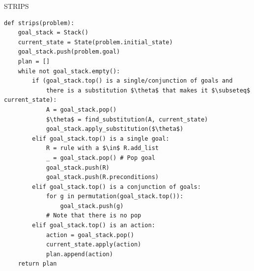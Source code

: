 \begin{algorithm}[H]
\caption{STRIPS}
\begin{lstlisting}[mathescape=true]
def strips(problem):
    goal_stack = Stack()
    current_state = State(problem.initial_state)
    goal_stack.push(problem.goal)
    plan = []
    while not goal_stack.empty():
        if (goal_stack.top() is a single/conjunction of goals and
            there is a substitution $\theta$ that makes it $\subseteq$ current_state):
            A = goal_stack.pop()
            $\theta$ = find_substitution(A, current_state)
            goal_stack.apply_substitution($\theta$)
        elif goal_stack.top() is a single goal:
            R = rule with a $\in$ R.add_list
            _ = goal_stack.pop() # Pop goal
            goal_stack.push(R)
            goal_stack.push(R.preconditions)
        elif goal_stack.top() is a conjunction of goals:
            for g in permutation(goal_stack.top()):
                goal_stack.push(g)
            # Note that there is no pop
        elif goal_stack.top() is an action:
            action = goal_stack.pop()
            current_state.apply(action)
            plan.append(action)
    return plan
\end{lstlisting}
\end{algorithm}


